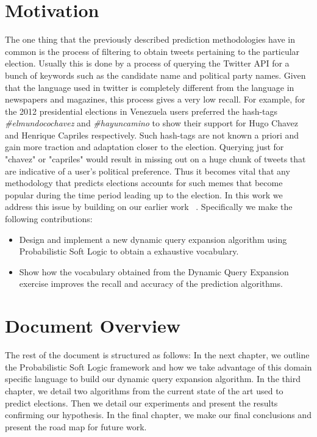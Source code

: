 \section{Motivation}
The one thing that the previously described prediction methodologies have in common is the process of filtering to obtain tweets pertaining to the particular election.
Usually this is done by a process of querying the Twitter API for a bunch of keywords such as the candidate name and political party names.
Given that the language used in twitter is completely different from the language in newspapers and magazines, this process gives a very low recall.
For example, for the 2012 presidential elections in Venezuela users preferred  the hash-tags \emph{\#elmundocochavez} and \emph{\#hayuncamino} to show their support for Hugo Chavez and Henrique Capriles respectively.
Such hash-tags are not known a priori and gain more traction and adaptation closer to the election.
Querying just for "chavez" or "capriles" would result in missing out on a huge chunk of tweets that are indicative of a user's political preference.
Thus it becomes vital that any methodology that predicts elections accounts for such memes that become popular during the time period leading up to the election.
In this work we address this issue by building on our earlier work ~\cite{huang2012social}.
Specifically we make the following contributions:
\begin{itemize}
\item
Design and implement a new dynamic query expansion algorithm using Probabilistic Soft Logic to obtain a exhaustive vocabulary.
\item
Show how the vocabulary obtained from the Dynamic Query Expansion exercise improves the recall and accuracy of the prediction algorithms.
\end{itemize}
\section{Document Overview}
The rest of the document is structured as follows:
\newline In the next chapter, we outline the Probabilistic Soft Logic framework and how we take advantage of this domain specific language to build our dynamic query expansion algorithm.
\newline In the third chapter, we detail two algorithms from the current state of the art used to predict elections.
\newline Then we detail our experiments and present the results confirming our hypothesis.
\newline In the final chapter, we make our final conclusions and present the road map for future work.
